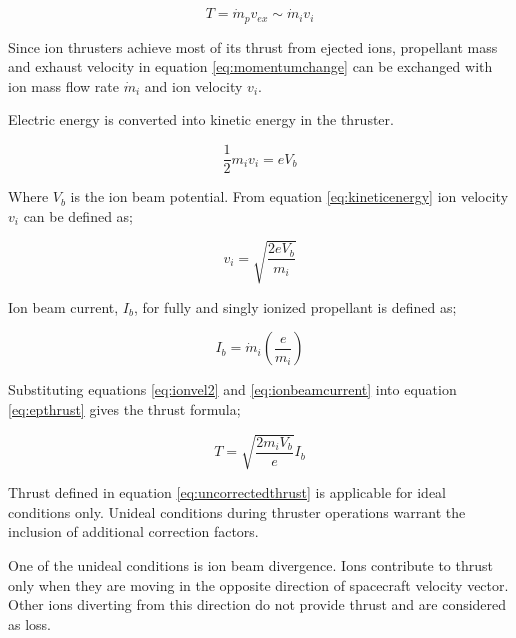 \begin{equation}
    T = \dot{m}_p v_{ex} \sim \dot{m}_i v_i
    \label{eq:epthrust}
\end{equation}

Since ion thrusters achieve most of its thrust from ejected ions, propellant mass and exhaust velocity in equation \ref{eq:momentumchange} can be exchanged with ion mass flow rate 
$\dot{m}_i$ and ion velocity $v_i$\cite{goebel2008fundamentals}.

Electric energy is converted into kinetic energy in the thruster.

\begin{equation}
    \frac{1}{2}m_i v_i = e V_b
    \label{eq:kineticenergy}
\end{equation}

Where $V_b$ is the ion beam potential. From equation \ref{eq:kineticenergy} ion velocity $v_i$ can be defined as;

\begin{equation}
    v_i = \sqrt{\frac{2eV_b}{m_i}}
    \label{eq:ionvel2}
\end{equation}

Ion beam current, $I_b$, for fully and singly ionized propellant is defined as\cite{goebel2008fundamentals};

\begin{equation}
    I_b = \dot{m}_i\left(\frac{e}{m_i}\right)
    \label{eq:ionbeamcurrent}
\end{equation}

Substituting equations \ref{eq:ionvel2} and \ref{eq:ionbeamcurrent} into equation \ref{eq:epthrust} gives the thrust formula;

\begin{equation}
    T = \sqrt{\frac{2 m_i V_b}{e}} I_b
    \label{eq:uncorrectedthrust}
\end{equation}

Thrust defined in equation \ref{eq:uncorrectedthrust} is applicable for ideal conditions only. Unideal conditions during thruster operations warrant the inclusion  of additional correction factors. 

One of the unideal conditions is ion beam divergence. Ions contribute to thrust only when they are moving in the opposite direction of spacecraft velocity vector. Other ions diverting from this direction do not provide thrust and are considered as loss. 

